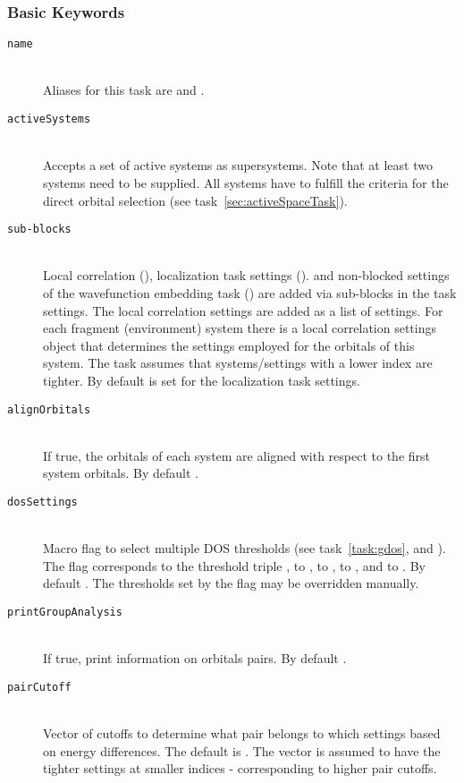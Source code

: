 \subsubsection{Basic Keywords}
\begin{description}
\item [\texttt{name}]\hfill \\
Aliases for this task are  and .
\item [\texttt{activeSystems}]\hfill \\
Accepts a set of active systems as supersystems. Note that at least two systems need to be supplied.
All systems have to fulfill the criteria for the direct orbital selection (see task~\ref{sec:activeSpaceTask}).
\item [\texttt{sub-blocks}]\hfill \\
Local correlation (), localization task settings (). and non-blocked settings
of the wavefunction embedding task () are added via sub-blocks in the task settings.
The local correlation settings are added as a list of settings. For each fragment (environment) system there is
a local correlation settings object that determines the settings employed for the orbitals of this system. The
task assumes that systems/settings with a lower index are tighter.
By default  is set for the localization task settings.
\item [\texttt{alignOrbitals}]\hfill \\
If true, the orbitals of each system are aligned with respect to the first system orbitals. By default .
\item [\texttt{dosSettings}]\hfill \\
Macro flag to select multiple DOS thresholds (see task~\ref{task:gdos}, 
and ). The flag  corresponds to the threshold triple ,
 to ,  to  ,  to ,
and  to .
By default . The thresholds set by the flag may be overridden manually.
\item [\texttt{printGroupAnalysis}]\hfill \\
If true, print information on orbitals pairs. By default .
\item[\texttt{pairCutoff}] \hfill \\
Vector of cutoffs to determine what pair belongs to which settings based on energy differences. The default is . The vector is assumed to have the tighter settings at smaller indices -  corresponding to higher pair cutoffs.

\end{description}
